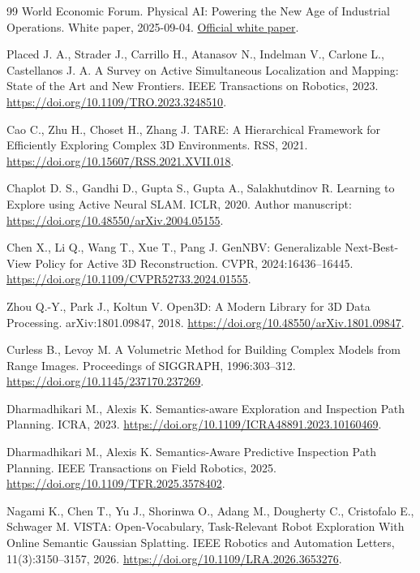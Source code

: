 \documentclass[pdflatex,sn-mathphys-num]{sn-jnl}
\begin{document}
\begin{thebibliography}{99}
 World Economic Forum. Physical AI: Powering the New Age of Industrial Operations. White paper, 2025-09-04. \href{https://www.weforum.org/publications/physical-ai-powering-the-new-age-of-industrial-operations/}{Official white paper}.

 Placed J. A., Strader J., Carrillo H., Atanasov N., Indelman V., Carlone L., Castellanos J. A. A Survey on Active Simultaneous Localization and Mapping: State of the Art and New Frontiers. IEEE Transactions on Robotics, 2023. \url{https://doi.org/10.1109/TRO.2023.3248510}.

 Cao C., Zhu H., Choset H., Zhang J. TARE: A Hierarchical Framework for Efficiently Exploring Complex 3D Environments. RSS, 2021. \url{https://doi.org/10.15607/RSS.2021.XVII.018}.

 Chaplot D. S., Gandhi D., Gupta S., Gupta A., Salakhutdinov R. Learning to Explore using Active Neural SLAM. ICLR, 2020. Author manuscript: \url{https://doi.org/10.48550/arXiv.2004.05155}.

 Chen X., Li Q., Wang T., Xue T., Pang J. GenNBV: Generalizable Next-Best-View Policy for Active 3D Reconstruction. CVPR, 2024:16436--16445. \url{https://doi.org/10.1109/CVPR52733.2024.01555}.

 Zhou Q.-Y., Park J., Koltun V. Open3D: A Modern Library for 3D Data Processing. arXiv:1801.09847, 2018. \url{https://doi.org/10.48550/arXiv.1801.09847}.

 Curless B., Levoy M. A Volumetric Method for Building Complex Models from Range Images. Proceedings of SIGGRAPH, 1996:303--312. \url{https://doi.org/10.1145/237170.237269}.

 Dharmadhikari M., Alexis K. Semantics-aware Exploration and Inspection Path Planning. ICRA, 2023. \url{https://doi.org/10.1109/ICRA48891.2023.10160469}.

 Dharmadhikari M., Alexis K. Semantics-Aware Predictive Inspection Path Planning. IEEE Transactions on Field Robotics, 2025. \url{https://doi.org/10.1109/TFR.2025.3578402}.

 Nagami K., Chen T., Yu J., Shorinwa O., Adang M., Dougherty C., Cristofalo E., Schwager M. VISTA: Open-Vocabulary, Task-Relevant Robot Exploration With Online Semantic Gaussian Splatting. IEEE Robotics and Automation Letters, 11(3):3150--3157, 2026. \url{https://doi.org/10.1109/LRA.2026.3653276}.


\end{thebibliography}
\end{document}
